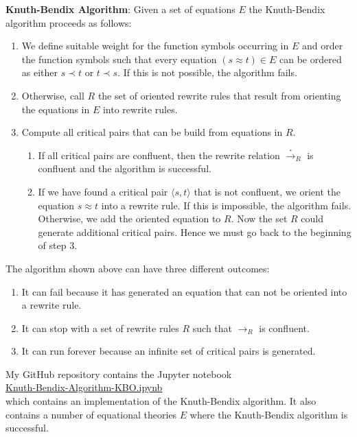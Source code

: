 \noindent
\textbf{Knuth-Bendix Algorithm}:  Given a set of equations $E$ the Knuth-Bendix algorithm proceeds as follows:
\begin{enumerate}
\item We define suitable weight for the function symbols occurring in $E$ and order the function symbols
      such that every equation  $(s \approx t) \in E$ can be ordered as either $s \prec t$ or $t \prec s$.
      If this is not possible, the algorithm fails.
\item Otherwise, call $R$ the set of oriented rewrite rules that result from orienting the equations in $E$
      into rewrite rules.
\item Compute all critical pairs that can be build from equations in $R$.
      \begin{enumerate}
      \item If all critical pairs are confluent, then the rewrite relation $\stackrel{_*}{\rightarrow}_R$ is confluent
            and the algorithm is successful.
      \item If we have found a critical pair $\langle s, t \rangle$ that is not confluent,
            we orient the equation $s \approx t$ into a rewrite rule.  If this is impossible, the algorithm fails.
            Otherwise, we add the oriented equation to $R$.
            Now the set $R$ could generate additional critical pairs.
            Hence we must go back to the beginning of step 3. \eod
      \end{enumerate}
\end{enumerate}

\noindent
The algorithm shown above can have three different outcomes:
\begin{enumerate}
\item It can fail because it has generated an equation that can not be oriented into a rewrite rule.
\item It can stop with a set of rewrite rules $R$ such that $\rightarrow_R$ is confluent.
\item It can run forever because an infinite set of critical pairs is generated.
\end{enumerate} 
My GitHub repository contains the Jupyter notebook
\\[0.2cm]
\hspace*{1.3cm}
\href{https://github.com/karlstroetmann/Artificial-Intelligence/blob/master/Python/4%20Automatic%20Theorem%20Proving/Knuth-Bendix-Algorithm-KBO.ipynb}{Knuth-Bendix-Algorithm-KBO.ipynb}
\\[0.2cm]
which contains an implementation of the Knuth-Bendix algorithm.  It also contains a number of equational
theories $E$ where the Knuth-Bendix algorithm is successful.
\pagebreak


